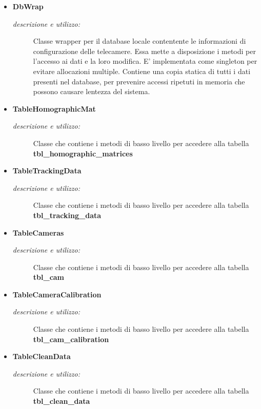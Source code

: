 \begin{itemize} 
\item \textbf{DbWrap}
\begin{description}
\item [\textit{descrizione e utilizzo:}] Classe wrapper per il database locale contentente le informazioni di configurazione delle telecamere. Essa mette a disposizione i metodi per l'accesso ai dati e la loro modifica. E' implementata come singleton per evitare allocazioni multiple. Contiene una copia statica di tutti i dati presenti nel database, per prevenire accessi ripetuti in memoria che possono causare lentezza del sistema.
\end{description}
\item \textbf{TableHomographicMat}
\begin{description}
\item [\textit{descrizione e utilizzo:}] Classe che contiene i metodi di basso livello per accedere alla tabella \textbf{tbl_homographic_matrices}
\end{description}
\item \textbf{TableTrackingData}
\begin{description}
\item [\textit{descrizione e utilizzo:}] Classe che contiene i metodi di basso livello per accedere alla tabella \textbf{tbl_tracking_data}
\end{description}
\item \textbf{TableCameras}
\begin{description}
\item [\textit{descrizione e utilizzo:}] Classe che contiene i metodi di basso livello per accedere alla tabella \textbf{tbl_cam}
\end{description}
\item \textbf{TableCameraCalibration}
\begin{description}
\item [\textit{descrizione e utilizzo:}] Classe che contiene i metodi di basso livello per accedere alla tabella \textbf{tbl_cam_calibration}
\end{description}
\item \textbf{TableCleanData}
\begin{description}
\item [\textit{descrizione e utilizzo:}] Classe che contiene i metodi di basso livello per accedere alla tabella \textbf{tbl_clean_data}
\end{description}
\end{itemize}

